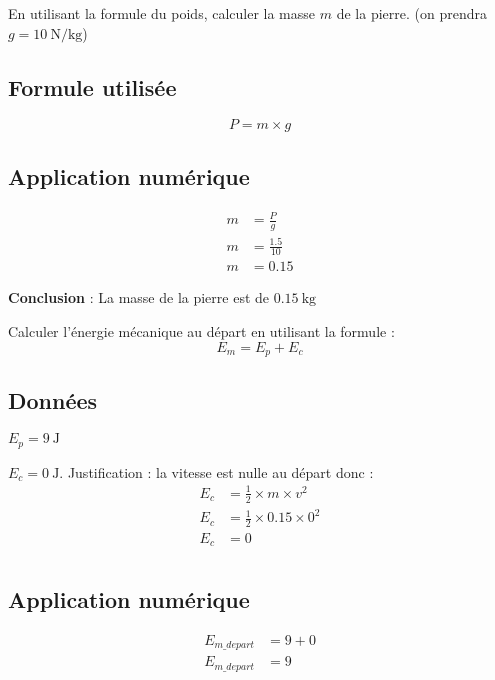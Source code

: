 \documentclass[answers]{exam}
\begin{document}
\begin{questions}

\question[1] En utilisant la formule du poids, calculer la masse $m$ de la pierre. (on prendra \(g = \SI{10}{\newton\per\kilogram}\))

\begin{solution}

\subsection*{Formule utilisée}
\[
P = m \times g
\]

\subsection*{Application numérique}

\begin{align*}
m &= \frac{P}{g} \\
m &= \frac{1.5}{10} \\
m &= 0.15
\end{align*}

\textbf{Conclusion} : La masse de la pierre est de \(\SI{0.15}{\kilogram}\)
\end{solution}

\question[0.5] Calculer l'énergie mécanique au départ en utilisant la formule :
\[
E_m = E_p + E_c
\]

\begin{solution}

\subsection*{Données}
\begin{compactitem}
  \item $E_p = \SI{9}{\joule}$
  \item $E_c = \SI{0}{\joule}$. Justification : la vitesse est nulle au départ donc :
  \begin{align*}
  E_c &= \frac{1}{2} \times m \times v^2 \\
  E_c &= \frac{1}{2} \times 0.15 \times 0^2 \\
  E_c &= 0 \\
  \end{align*}
\end{compactitem}

\subsection*{Application numérique}
\begin{align*}
E_{m\_depart} &= 9 + 0 \\
E_{m\_depart} &= 9
\end{align*}


\end{solution}
\end{questions}
\end{document}
